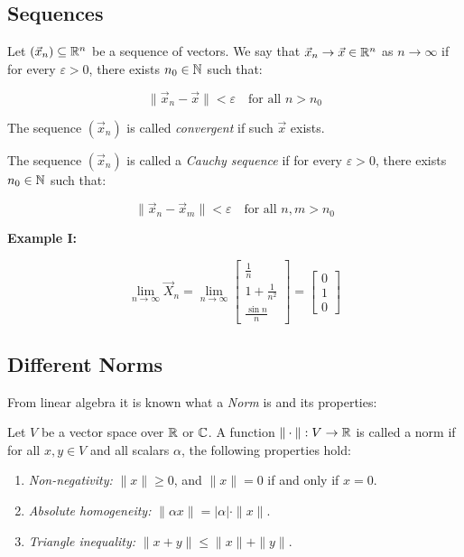 \subsection{Sequences}

Let \( (\vec{x}_n) \subseteq \mathbb{R}^n \) be a sequence of vectors. We say that 
\( \vec{x}_n \to \vec{x} \in \mathbb{R}^n \) as \( n \to \infty \) if for every \( \varepsilon > 0 \), 
there exists \( n_0 \in \mathbb{N} \) such that:
    
\[
    \|\vec{x}_n - \vec{x}\| < \varepsilon \quad \text{for all } n > n_0
\]

The sequence \( (\vec{x}_n) \) is called \emph{convergent} if such \( \vec{x} \) exists.

The sequence \( (\vec{x}_n) \) is called a \emph{Cauchy sequence} if for every \( \varepsilon > 0 \), 
there exists \( n_0 \in \mathbb{N} \) such that:

\[
    \|\vec{x}_n - \vec{x}_m\| < \varepsilon \quad \text{for all } n, m > n_0
\]

\textbf{Example I:}

\[
    \lim_{n \to \infty} \vec{X}_n = \lim_{n \to \infty} \begin{bmatrix} \frac{1}{n} \\
    1 + \frac{1}{n^2} \\ \frac{\sin n}{n}\end{bmatrix} = \begin{bmatrix}
        0 \\ 1 \\ 0
    \end{bmatrix}
\]

\subsection{Different Norms}

From linear algebra it is known what a \emph{Norm} is and its properties:

Let \( V \) be a vector space over \( \mathbb{R} \) or \( \mathbb{C} \). A function 
\( \|\cdot\|: V \to \mathbb{R} \) is called a norm if for all \( x, y \in V \) and all scalars 
\( \alpha \), the following properties hold:

\begin{enumerate}
    
    \item \emph{Non-negativity:} \( \|x\| \geq 0 \), and \( \|x\| = 0 \) if and only if \( x = 0 \).
    
    \item \emph{Absolute homogeneity:} \( \|\alpha x\| = |\alpha| \cdot \|x\| \).
    
    \item \emph{Triangle inequality:} \( \|x + y\| \leq \|x\| + \|y\| \).

\end{enumerate}

